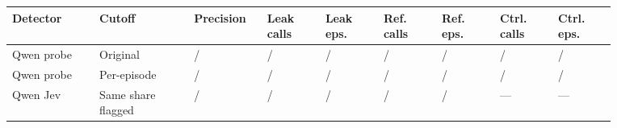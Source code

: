\begin{tabular}{@{}>{\raggedright\arraybackslash}p{0.12\linewidth}>{\raggedright\arraybackslash}p{0.13\linewidth}>{\raggedright\arraybackslash}p{0.088\linewidth}>{\raggedright\arraybackslash}p{0.088\linewidth}>{\raggedright\arraybackslash}p{0.088\linewidth}>{\raggedright\arraybackslash}p{0.088\linewidth}>{\raggedright\arraybackslash}p{0.088\linewidth}>{\raggedright\arraybackslash}p{0.088\linewidth}>{\raggedright\arraybackslash}p{0.088\linewidth}@{}}
\toprule
Detector & Cutoff & Precision & Leak calls & Leak eps. & Ref. calls & Ref. eps. & Ctrl. calls & Ctrl. eps. \\
\midrule
Qwen probe & Original & \qwenCalibrationOriginalPrecisionNumerator{}/\qwenCalibrationOriginalPrecisionDenominator{} & \qwenCalibrationOriginalLeakCallsNumerator{}/\qwenCalibrationOriginalLeakCallsDenominator{} & \qwenCalibrationOriginalLeakEpisodesNumerator{}/\qwenCalibrationOriginalLeakEpisodesDenominator{} & \qwenCalibrationOriginalRefusingCallsNumerator{}/\qwenCalibrationOriginalRefusingCallsDenominator{} & \qwenCalibrationOriginalRefusingEpisodesNumerator{}/\qwenCalibrationOriginalRefusingEpisodesDenominator{} & \qwenCalibrationOriginalControlCallsNumerator{}/\qwenCalibrationOriginalControlCallsDenominator{} & \qwenCalibrationOriginalControlEpisodesNumerator{}/\qwenCalibrationOriginalControlEpisodesDenominator{} \\
Qwen probe & Per-episode & \qwenCalibrationEpisodePrecisionNumerator{}/\qwenCalibrationEpisodePrecisionDenominator{} & \qwenCalibrationEpisodeLeakCallsNumerator{}/\qwenCalibrationEpisodeLeakCallsDenominator{} & \qwenCalibrationEpisodeLeakEpisodesNumerator{}/\qwenCalibrationEpisodeLeakEpisodesDenominator{} & \qwenCalibrationEpisodeRefusingCallsNumerator{}/\qwenCalibrationEpisodeRefusingCallsDenominator{} & \qwenCalibrationEpisodeRefusingEpisodesNumerator{}/\qwenCalibrationEpisodeRefusingEpisodesDenominator{} & \qwenCalibrationEpisodeControlCallsNumerator{}/\qwenCalibrationEpisodeControlCallsDenominator{} & \qwenCalibrationEpisodeControlEpisodesNumerator{}/\qwenCalibrationEpisodeControlEpisodesDenominator{} \\
Qwen Jev & Same share flagged & \qwenJevCalibrationMatchedPrecisionNumerator{}/\qwenJevCalibrationMatchedPrecisionDenominator{} & \qwenJevCalibrationMatchedLeakCallsNumerator{}/\qwenJevCalibrationMatchedLeakCallsDenominator{} & \qwenJevCalibrationMatchedLeakEpisodesNumerator{}/\qwenJevCalibrationMatchedLeakEpisodesDenominator{} & \qwenJevCalibrationMatchedRefusingCallsNumerator{}/\qwenJevCalibrationMatchedRefusingCallsDenominator{} & \qwenJevCalibrationMatchedRefusingEpisodesNumerator{}/\qwenJevCalibrationMatchedRefusingEpisodesDenominator{} & --- & --- \\

\end{tabular}
